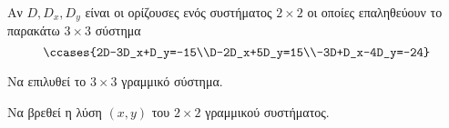 Αν $ D,D_x,D_y $ είναι οι ορίζουσες ενός συστήματος $ 2\times2 $ οι οποίες επαληθεύουν το παρακάτω $ 3\times3 $ σύστημα 
\[ \ccases{2D-3D_x+D_y=-15\\D-2D_x+5D_y=15\\-3D+D_x-4D_y=-24} \]
\begin{rlist}
\item Να επιλυθεί το $ 3\times3 $ γραμμικό σύστημα.
\item Να βρεθεί η λύση $ (x,y) $ του $ 2\times2 $ γραμμικού συστήματος.
\end{rlist}